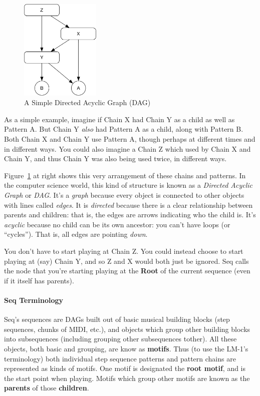\documentclass[twoside,10pt]{article}
\begin{document}
\begin{figure}
\vspace{-1em}
\includegraphics[width=1.5in]{dag}
\caption{A Simple Directed Acyclic Graph (DAG)}
\label{dag}
\end{figure}

As a simple example, imagine if Chain X had Chain Y as a child as well as Pattern A.  But Chain Y {\it also} had Pattern A as a child, along with Pattern B.  Both Chain X and Chain Y use Pattern A, though perhaps at different times and in different ways.  You could also imagine a Chain Z which used by Chain X and Chain Y, and thus Chain Y was also being used twice, in different ways.

Figure~\ref{dag} at right shows this very arrangement of these chains and patterns. In the computer science world, this kind of structure is known as a {\it Directed Acyclic Graph} or {\it DAG}.  It's a {\it graph} because every object is connected to other objects with lines called {\it edges}.  It is {\it directed} because there is a clear relationship between parents and children: that is, the edges are arrows indicating who the child is.  It's {\it acyclic} because no child can be its own ancestor: you can't have loops (or ``cycles'').  That is, all edges are pointing {\it down}.

You don't have to start playing at Chain Z.  You could instead choose to start playing at (say) Chain Y, and so Z and X would both just be ignored.  Seq calls the node that you're starting playing at the {\bf Root} of the current sequence (even if it itself has parents).

\paragraph{Seq Terminology}

Seq's sequences are DAGs built out of basic musical building blocks (step sequences, chunks of MIDI, etc.), and objects which group other building blocks into subsequences (including grouping other subsequences tother).  All these objects, both basic and grouping, are know as {\bf motifs}.  Thus (to use the LM-1's terminology) both individual step sequence patterns and pattern chains are represented as kinds of motifs.  One motif is designated the {\bf root motif}, and is the start point when playing.  Motifs which group other motifs are known as the {\bf parents} of those {\bf children}.  
\end{document}

